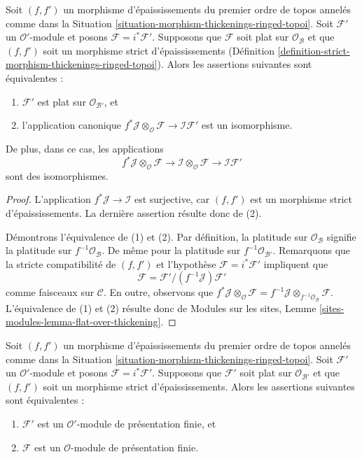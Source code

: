 \begin{lemma}
\label{lemma-deform-module-ringed-topoi}
Soit $(f, f')$ un morphisme d'épaississements du premier ordre de topos annelés
comme dans la
Situation \ref{situation-morphism-thickenings-ringed-topoi}.
Soit $\mathcal{F}'$ un $\mathcal{O}'$-module et posons
$\mathcal{F} = i^*\mathcal{F}'$.
Supposons que $\mathcal{F}$ soit plat sur $\mathcal{O}_\mathcal{B}$ et que
$(f, f')$ soit un morphisme strict d'épaississements
(Définition \ref{definition-strict-morphism-thickenings-ringed-topoi}).
Alors les assertions suivantes sont équivalentes :
\begin{enumerate}
\item $\mathcal{F}'$ est plat sur $\mathcal{O}_{\mathcal{B}'}$, et
\item l'application canonique
$f^*\mathcal{J} \otimes_\mathcal{O} \mathcal{F} \to
\mathcal{I}\mathcal{F}'$
est un isomorphisme.
\end{enumerate}
De plus, dans ce cas, les applications
$$
f^*\mathcal{J} \otimes_\mathcal{O} \mathcal{F} \to
\mathcal{I} \otimes_\mathcal{O} \mathcal{F} \to
\mathcal{I}\mathcal{F}'
$$
sont des isomorphismes.
\end{lemma}

\begin{proof}
L'application $f^*\mathcal{J} \to \mathcal{I}$ est surjective, car
$(f, f')$ est un morphisme strict d'épaississements.
La dernière assertion résulte donc de (2).

\medskip\noindent
Démontrons l'équivalence de (1) et (2). Par définition, la platitude sur
$\mathcal{O}_\mathcal{B}$ signifie la platitude sur
$f^{-1}\mathcal{O}_\mathcal{B}$. De même pour la platitude sur
$f^{-1}\mathcal{O}_{\mathcal{B}'}$.
Remarquons que la stricte compatibilité de $(f, f')$ et l'hypothèse
$\mathcal{F} = i^*\mathcal{F}'$ impliquent que
$$
\mathcal{F} = \mathcal{F}'/(f^{-1}\mathcal{J})\mathcal{F}'
$$
comme faisceaux sur $\mathcal{C}$. En outre, observons que
$f^*\mathcal{J} \otimes_\mathcal{O} \mathcal{F} =
f^{-1}\mathcal{J} \otimes_{f^{-1}\mathcal{O}_\mathcal{B}} \mathcal{F}$.
L'équivalence de (1) et (2) résulte donc de Modules sur les sites,
Lemme \ref{sites-modules-lemma-flat-over-thickening}.
\end{proof}

\begin{lemma}
\label{lemma-deform-fp-module-ringed-topoi}
Soit $(f, f')$ un morphisme d'épaississements du premier ordre de topos annelés
comme dans la
Situation \ref{situation-morphism-thickenings-ringed-topoi}.
Soit $\mathcal{F}'$ un $\mathcal{O}'$-module et posons
$\mathcal{F} = i^*\mathcal{F}'$.
Supposons que $\mathcal{F}'$ soit plat sur
$\mathcal{O}_{\mathcal{B}'}$ et que $(f, f')$ soit un morphisme strict
d'épaississements. Alors les assertions suivantes sont équivalentes :
\begin{enumerate}
\item $\mathcal{F}'$ est un $\mathcal{O}'$-module de présentation finie, et
\item $\mathcal{F}$ est un $\mathcal{O}$-module de présentation finie.
\end{enumerate}
\end{lemma}

